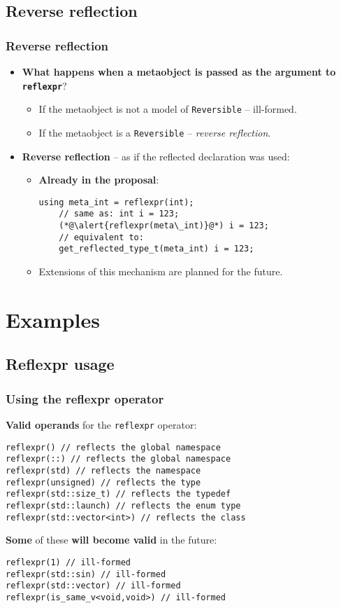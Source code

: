 \documentclass[compress,table,xcolor=table]{beamer}
\begin{document}
\subsection{Reverse reflection}
\begin{frame}[fragile]
\frametitle{Reverse reflection}
  \begin{itemize}
    \item {\large \textbf{What happens when a metaobject is passed as the argument
      to \texttt{reflexpr}}?}
    \begin{itemize}
      \item If the metaobject is not a model of \texttt{Reversible} -- ill-formed.
      \item If the metaobject is a \texttt{Reversible} -- {\em reverse reflection}.
    \end{itemize}
    \item \textbf{Reverse reflection} -- as if the reflected declaration was used:
    \begin{itemize}
      \item \textbf{Already in the proposal}:
      \begin{lstlisting}[basicstyle=\small\ttfamily]
	using meta_int = reflexpr(int);
	// same as: int i = 123;
	(*@\alert{reflexpr(meta\_int)}@*) i = 123;
	// equivalent to:
	get_reflected_type_t(meta_int) i = 123;
      \end{lstlisting}
      \item Extensions of this mechanism are planned for the future.
    \end{itemize}
  \end{itemize}
\end{frame}

\section{Examples}

\subsection{Reflexpr usage}
\begin{frame}[fragile]
\frametitle{Using the reflexpr operator}

\textbf{Valid operands} for the \texttt{reflexpr} operator:
\begin{lstlisting}[basicstyle=\small\ttfamily]
reflexpr() // reflects the global namespace
reflexpr(::) // reflects the global namespace
reflexpr(std) // reflects the namespace
reflexpr(unsigned) // reflects the type
reflexpr(std::size_t) // reflects the typedef
reflexpr(std::launch) // reflects the enum type
reflexpr(std::vector<int>) // reflects the class
\end{lstlisting}

\textbf{Some} of these \textbf{will become valid} in the future:
\begin{lstlisting}[basicstyle=\small\ttfamily]
reflexpr(1) // ill-formed
reflexpr(std::sin) // ill-formed
reflexpr(std::vector) // ill-formed
reflexpr(is_same_v<void,void>) // ill-formed
\end{lstlisting}
\end{frame}
\end{document}
